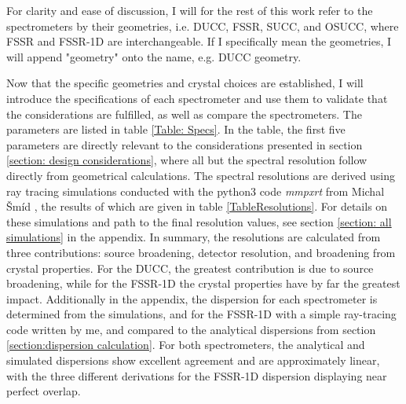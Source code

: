 For clarity and ease of discussion, I will for the rest of this work refer to the spectrometers by their geometries, i.e. DUCC, FSSR, SUCC, and OSUCC, where FSSR and FSSR-1D are interchangeable. If I specifically mean the geometries, I will append "geometry" onto the name, e.g. DUCC geometry.

Now that the specific geometries and crystal choices are 
established, I will introduce the specifications of each spectrometer 
and use them to 
validate that the considerations are fulfilled, 
as well as compare the spectrometers. The parameters are listed 
in table \ref{Table: Specs}. In the table, the first five parameters are 
directly 
relevant to the 
considerations presented in section \ref{section: design 
considerations}, where all but 
the spectral resolution follow directly from geometrical calculations. 
The spectral 
resolutions are derived using ray tracing simulations conducted with the python3 
code 
\textit{\textit{mmpxrt}} from Michal \v{S}m\'{i}d \citep{vsmid2021x}, the results of which are given in table \ref{TableResolutions}. For details 
on these 
simulations and path to the final resolution values, see section 
\ref{section: all 
simulations} in the appendix. In summary, the resolutions are calculated 
from three 
contributions: source broadening, detector resolution, and broadening 
from crystal 
properties. For the DUCC, the greatest contribution is due to source 
broadening, while 
for the FSSR-1D the crystal properties have by far the greatest impact. 
Additionally in the appendix, 
the dispersion for each spectrometer is determined from the simulations, 
and for the 
FSSR-1D with a simple ray-tracing code written by me, and compared to 
the analytical 
dispersions from section \ref{section:dispersion calculation}. For both 
spectrometers, 
the analytical and simulated dispersions show excellent agreement and 
are approximately 
linear, with the three different derivations for the FSSR-1D dispersion 
displaying near 
perfect overlap. 

